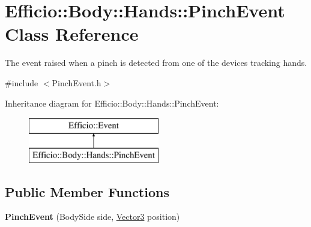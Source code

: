 \hypertarget{class_efficio_1_1_body_1_1_hands_1_1_pinch_event}{}\section{Efficio\+:\+:Body\+:\+:Hands\+:\+:Pinch\+Event Class Reference}
\label{class_efficio_1_1_body_1_1_hands_1_1_pinch_event}


The event raised when a pinch is detected from one of the devices tracking hands.  




{\ttfamily \#include $<$Pinch\+Event.\+h$>$}

Inheritance diagram for Efficio\+:\+:Body\+:\+:Hands\+:\+:Pinch\+Event\+:\begin{figure}[H]
\begin{center}
\leavevmode
\includegraphics[height=2.000000cm]{class_efficio_1_1_body_1_1_hands_1_1_pinch_event}
\end{center}
\end{figure}
\subsection*{Public Member Functions}
\begin{DoxyCompactItemize}
\item 
{\bfseries Pinch\+Event} (Body\+Side side, \hyperlink{class_efficio_1_1_vector3}{Vector3} position)\hypertarget{class_efficio_1_1_body_1_1_hands_1_1_pinch_event_a9343a804d70ebbf9eef81fbaa7bf6e0f}{}\label{class_efficio_1_1_body_1_1_hands_1_1_pinch_event_a9343a804d70ebbf9eef81fbaa7bf6e0f}

\end{DoxyCompactItemize}
